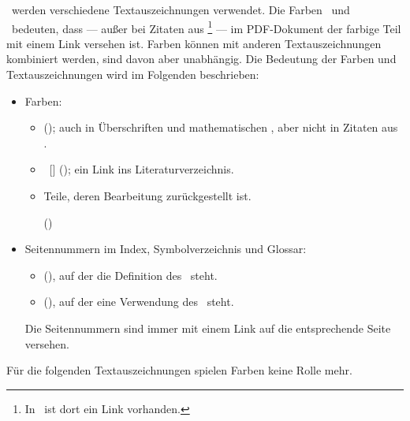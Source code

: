\Hier\ werden verschiedene Textauszeichnungen verwendet.
Die Farben \LinkFarbe\ und \BibFarbe\ bedeuten, dass --- außer bei Zitaten aus \Wikipedia%
\footnote{In \Wikipedia\ ist dort ein Link vorhanden.}
--- im PDF-Dokument der farbige Teil mit einem Link versehen ist.
Farben können mit anderen Textauszeichnungen kombiniert werden, sind davon aber unabhängig.
Die Bedeutung der Farben und Textauszeichnungen wird im Folgenden beschrieben:
\begin{itemize}
	\item Farben:
	\begin{itemize}
		\item {} (\LinkFarbe); auch in Überschriften und mathematischen \Formeln, aber nicht in Zitaten aus \Wikipedia.
		\item\ [] (\BibFarbe); ein Link ins Literaturverzeichnis.
		\iftestFlg
		\item
			\begin{offen}
				Teile, deren Bearbeitung zurückgestellt ist.
			\end{offen}
		(\offenFarbe)
		\else\fi
	\end{itemize}
	\item Seitennummern im Index, Symbolverzeichnis und Glossar:
	\begin{itemize}
		\item {} (\HyperDefTyp), auf der die  Definition des \Begriffs\ steht.
		\item {} (\HyperTxtTyp), auf der eine Verwendung des \Begriffs\ steht.
	\end{itemize}
	Die Seitennummern sind immer mit einem Link auf die entsprechende Seite versehen.
\end{itemize}
Für die folgenden Textauszeichnungen spielen Farben keine Rolle mehr.
